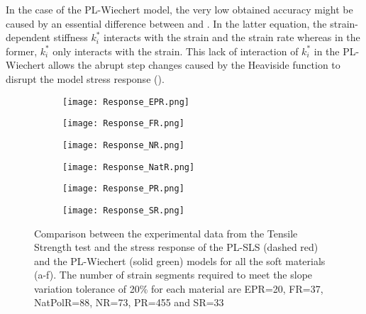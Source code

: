 In the case of the PL-Wiechert model, the very low obtained accuracy might be caused by an essential difference between  and . In the latter equation, the strain-dependent stiffness $k_i^*$ interacts with the strain and the strain rate whereas in the former, $k_i^*$ only interacts with the strain. This lack of interaction of $k_i^*$ in the PL-Wiechert allows the abrupt step changes caused by the Heaviside function to disrupt the model stress response ().

\begin{figure}[htb!]
	\centering
    \begin{subfigure}[b]{0.49\textwidth}
        \centering
        \texttt{[image: Response\_EPR.png]}
        \caption{}
        \label{fig:ResponseEPR}
    \end{subfigure}
    \begin{subfigure}[b]{0.49\textwidth}
        \centering
        \texttt{[image: Response\_FR.png]}
        \caption{}
        \label{fig:ResponseFR}
    \end{subfigure}
    \begin{subfigure}[b]{0.49\textwidth}
        \centering
        \texttt{[image: Response\_NR.png]}
        \caption{}
        \label{fig:ResponseNR}
    \end{subfigure}
    \begin{subfigure}[b]{0.49\textwidth}
        \centering
        \texttt{[image: Response\_NatR.png]}
        \caption{}
        \label{fig:ResponseNatR}
    \end{subfigure}  
    \begin{subfigure}[b]{0.49\textwidth}
        \centering
        \texttt{[image: Response\_PR.png]}
        \caption{}
        \label{fig:ResponsePR}
    \end{subfigure}  
    \begin{subfigure}[b]{0.49\textwidth}
        \centering
        \texttt{[image: Response\_SR.png]}
        \caption{}
        \label{fig:ResponseSR}
    \end{subfigure}  
    \caption{Comparison between the experimental data from the Tensile Strength test and the stress response of the PL-SLS (dashed red) and the PL-Wiechert (solid green) models for all the soft materials (a-f). The number of strain segments required to meet the slope variation tolerance of 20\% for each material are EPR=20, FR=37, NatPolR=88, NR=73, PR=455 and SR=33 \cite{solis2018assessment}}
    \label{fig:ResponseAll}
\end{figure}

